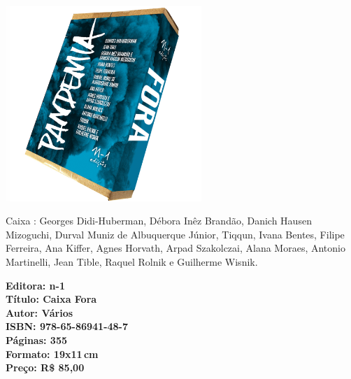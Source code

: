 \pagebreak

\begin{center}
\hspace*{.5cm}\includegraphics[width=74mm]{./CAPAS/N-1_CAIXA.jpg}
\end{center}

\hspace*{-7cm}\hrulefill\hspace*{-7cm}

\medskip

\noindent{} Caixa : Georges Didi-Huberman, Débora Inêz Brandão, Danich Hausen Mizoguchi, Durval Muniz de Albuquerque Júnior, Tiqqun, Ivana Bentes, Filipe Ferreira, Ana Kiffer, Agnes Horvath, Arpad Szakolczai, Alana Moraes, Antonio Martinelli, Jean Tible, Raquel Rolnik e Guilherme Wisnik.

\vfill

\hspace*{-.4cm}\begin{minipage}[c]{.5\linewidth}
\small\textbf{
\hspace*{-.1cm}Editora: n-1\\
Título: Caixa Fora\\
Autor: Vários\\
ISBN: 978-65-86941-48-7\\
Páginas: 355\\
Formato: 19x11\,cm\\
Preço: R\$ 85,00\\
}
\end{minipage}

\pagebreak

